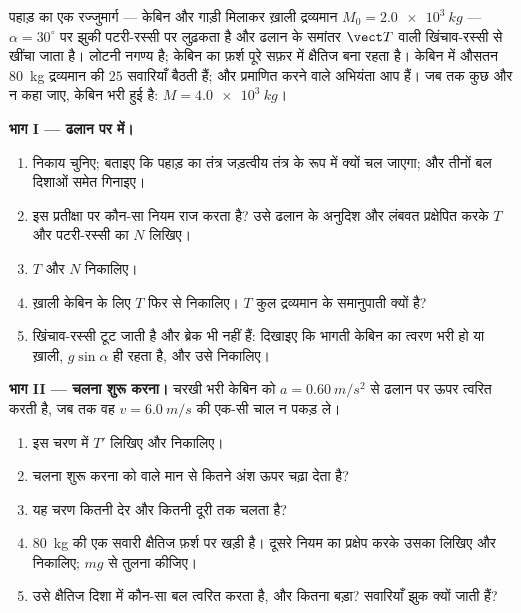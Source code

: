 \begin{problem}
\label{pb:g12:newtons-laws:1}
पहाड़ का एक रज्जुमार्ग --- केबिन और गाड़ी मिलाकर ख़ाली द्रव्यमान $M_0 = \qty{2.0e3}{kg}$ ---
$\alpha = 30^\circ$ पर झुकी पटरी-रस्सी पर लुढ़कता है और ढलान के समांतर 
$\vect T$ वाली खिंचाव-रस्सी से खींचा जाता है। लोटनी  नगण्य है;
केबिन का फ़र्श पूरे सफ़र में क्षैतिज बना रहता है। केबिन में औसतन \qty{80}{kg}
द्रव्यमान की $25$ सवारियाँ बैठती हैं; और प्रमाणित करने वाले अभियंता आप हैं।
जब तक कुछ और न कहा जाए, केबिन भरी हुई है: $M = \qty{4.0e3}{kg}$।

\medskip
\noindent\textbf{भाग I --- ढलान पर  में।}
\begin{enumerate}
  \item निकाय चुनिए; बताइए कि पहाड़ का तंत्र जड़त्वीय तंत्र के रूप में क्यों
        चल जाएगा; और तीनों बल दिशाओं समेत गिनाइए।
  \item इस प्रतीक्षा पर कौन-सा नियम राज करता है? उसे ढलान के अनुदिश और लंबवत
        प्रक्षेपित करके $T$ और पटरी-रस्सी का  $N$
        लिखिए।
  \item $T$ और $N$ निकालिए।
  \item ख़ाली केबिन के लिए $T$ फिर से निकालिए। $T$ कुल द्रव्यमान के
        समानुपाती क्यों है?
  \item खिंचाव-रस्सी टूट जाती है और ब्रेक भी नहीं हैं: दिखाइए कि भागती केबिन
        का त्वरण भरी हो या ख़ाली, $g \sin\alpha$ ही रहता है, और उसे निकालिए।
\end{enumerate}

\medskip
\noindent\textbf{भाग II --- चलना शुरू करना।} चरखी भरी केबिन को $a = \qty{0.60}{m/s^2}$ से
ढलान पर ऊपर त्वरित करती है, जब तक वह $v = \qty{6.0}{m/s}$ की एक-सी चाल न पकड़ ले।
\begin{enumerate}[resume]
  \item इस चरण में  $T'$ लिखिए और निकालिए।
  \item चलना शुरू करना  को  वाले मान से कितने अंश ऊपर चढ़ा
        देता है?
  \item यह चरण कितनी देर और कितनी दूरी तक चलता है?
  \item \qty{80}{kg} की एक सवारी क्षैतिज फ़र्श पर खड़ी है। दूसरे नियम का
         प्रक्षेप करके उसका  लिखिए और
        निकालिए; $mg$ से तुलना कीजिए।
  \item उसे क्षैतिज दिशा में कौन-सा बल त्वरित करता है, और कितना
        बड़ा? सवारियाँ झुक क्यों जाती हैं?
\end{enumerate}


\end{problem}
